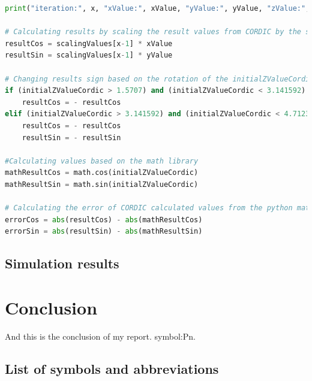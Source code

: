 \documentclass[a4paper, twoside, 11pt]{article}
\newcommand{\fbar}{\FloatBarrier}
\begin{document}
\begin{lstlisting}[language={python}, caption={Python code of \gls{abbreviation:cordic} implementation.}, label= {lst:python-cordic}]
    print("iteration:", x, "xValue:", xValue, "yValue:", yValue, "zValue:", zValue, "sigmaValue:", sigmaValue, "\n")

# Calculating results by scaling the result values from CORDIC by the scalingValue which depends on number of iterations which were made
resultCos = scalingValues[x-1] * xValue
resultSin = scalingValues[x-1] * yValue

# Changing results sign based on the rotation of the initialZValueCordic
if (initialZValueCordic > 1.5707) and (initialZValueCordic < 3.141592):
    resultCos = - resultCos
elif (initialZValueCordic > 3.141592) and (initialZValueCordic < 4.7123):
    resultCos = - resultCos
    resultSin = - resultSin

#Calculating values based on the math library
mathResultCos = math.cos(initialZValueCordic)
mathResultSin = math.sin(initialZValueCordic)

# Calculating the error of CORDIC calculated values from the python math functions
errorCos = abs(resultCos) - abs(mathResultCos)
errorSin = abs(resultSin) - abs(mathResultSin)
\end{lstlisting}

    \subsection{Simulation results}

\newpage
{} 
\section*{Conclusion}
And this is the conclusion of my report. \gls{symbol:Pn}.

\flushbottom %


\newpage
\setmonofont{Times New Roman}
\printbibliography[title={{References}}]	
\nocite{*}
\setmonofont{CourierPrime-Regular}
	\appendix
	\begin{appendices}
	\section{List of symbols and abbreviations}

		\printglossary[type=abbreviationslist, style = myStyleAbbreviations]

		\fbar
		\newpage
		\printglossary[type=symbolslist, style =  myStyleSymbols]

	\end{appendices}
\end{document}
